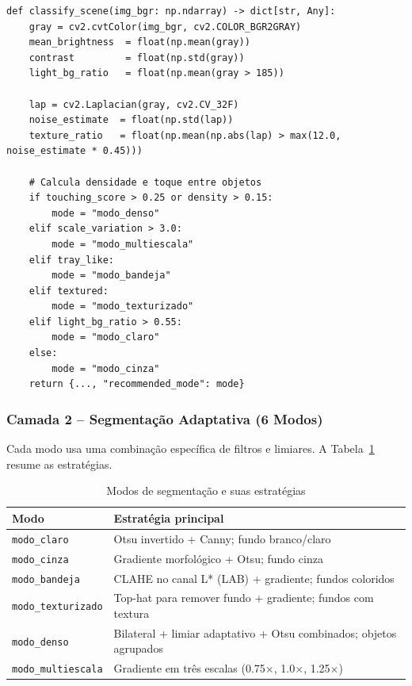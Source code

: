 \documentclass[12pt,a4paper]{article}
\begin{document}
\begin{lstlisting}[caption={An\'alise de cena para escolha autom\'atica de modo}]
def classify_scene(img_bgr: np.ndarray) -> dict[str, Any]:
    gray = cv2.cvtColor(img_bgr, cv2.COLOR_BGR2GRAY)
    mean_brightness  = float(np.mean(gray))
    contrast         = float(np.std(gray))
    light_bg_ratio   = float(np.mean(gray > 185))

    lap = cv2.Laplacian(gray, cv2.CV_32F)
    noise_estimate  = float(np.std(lap))
    texture_ratio   = float(np.mean(np.abs(lap) > max(12.0, noise_estimate * 0.45)))

    # Calcula densidade e toque entre objetos
    if touching_score > 0.25 or density > 0.15:
        mode = "modo_denso"
    elif scale_variation > 3.0:
        mode = "modo_multiescala"
    elif tray_like:
        mode = "modo_bandeja"
    elif textured:
        mode = "modo_texturizado"
    elif light_bg_ratio > 0.55:
        mode = "modo_claro"
    else:
        mode = "modo_cinza"
    return {..., "recommended_mode": mode}
\end{lstlisting}

\subsubsection{Camada 2 -- Segmenta\c{c}\~ao Adaptativa (6 Modos)}

Cada modo usa uma combina\c{c}\~ao espec\'ifica de filtros e limiares. A
Tabela~\ref{tab:modos} resume as estrat\'egias.

\begin{table}[H]
  \centering
  \caption{Modos de segmenta\c{c}\~ao e suas estrat\'egias}
  \label{tab:modos}
  \begin{tabular}{lp{9cm}}
    \toprule
    \textbf{Modo} & \textbf{Estrat\'egia principal} \\
    \midrule
    \texttt{modo\_claro}       & Otsu invertido + Canny; fundo branco/claro \\
    \texttt{modo\_cinza}       & Gradiente morfol\'ogico + Otsu; fundo cinza \\
    \texttt{modo\_bandeja}     & CLAHE no canal L* (LAB) + gradiente; fundos coloridos \\
    \texttt{modo\_texturizado} & Top-hat para remover fundo + gradiente; fundos com textura \\
    \texttt{modo\_denso}       & Bilateral + limiar adaptativo + Otsu combinados; objetos agrupados \\
    \texttt{modo\_multiescala} & Gradiente em tr\^es escalas (0.75$\times$, 1.0$\times$, 1.25$\times$) \\
    \bottomrule
  \end{tabular}
\end{table}
\end{document}
